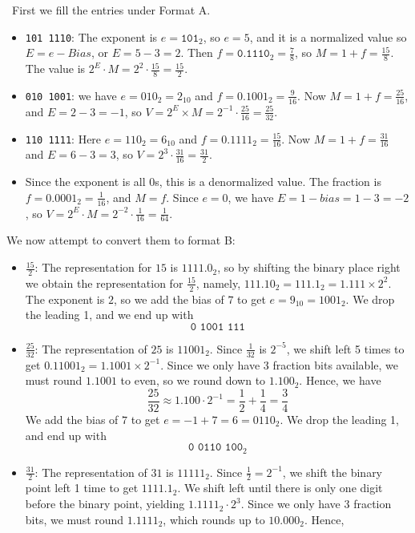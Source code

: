 \documentclass[12pt]{article}
\newenvironment{sol}[1][Solution]{\begin{trivlist}
		\item[\hskip \labelsep {\bfseries #1:}]}{\end{trivlist}}
\begin{document}
\begin{sol}
	\
	First we fill the entries under Format A.
	\begin{itemize}
		\item \texttt{101 1110}: The exponent
		is $e=\texttt{101}_2$, so $e=5$, and it is a normalized value so $E=e-Bias$,
		or $E=5-3=2$. Then $f=\texttt{0.1110}_2=\frac{7}{8}$, so $M=1+f=\frac{15}{8}$.
		The value is $2^E\cdot M=2^{2}\cdot \frac{15}{8}=\frac{15}{2}$.
		\item \texttt{010 1001}: we have $e=010_2=2_{10}$ and $f=0.1001_2=\frac{9}{16}$.
		Now $M=1+f=\frac{25}{16}$, and $E=2-3=-1$, so 
		$V=2^E\times M=2^{-1}\cdot \frac{25}{16}=\frac{25}{32}$.
		\item \texttt{110 1111}: Here $e=110_2=6_{10}$ and $f=0.1111_2=\frac{15}{16}$.
		Now $M=1+f=\frac{31}{16}$ and $E=6-3=3$, so $V=2^{3}\cdot \frac{31}{16}=\frac{31}{2}$.
		\item Since the exponent is all 0s, this is a denormalized value. The fraction
		is $f=0.0001_2=\frac{1}{16}$, and $M=f$. Since $e=0$, we have $E=1-bias=1-3=-2$,
		so $V=2^{E}\cdot M=2^{-2}\cdot \frac{1}{16}=\frac{1}{64}$. 
	\end{itemize}
	We now attempt to convert them to format B:
	\begin{itemize}
		\item $\frac{15}{2}$: The representation for $15$ is $1111.0_2$, so by shifting
		the binary place right we obtain the representation for $\frac{15}{2}$, namely,
		$111.10_2=111.1_2=1.111\times 2^2$. The exponent is $2$, so we add the bias of
		$7$ to get $e=9_{10}=1001_2$. We drop the leading 1, and we end up with
		\[
		\texttt{0 1001 111}
		\]
		\item $\frac{25}{32}$: The representation of $25$ is $11001_2$. Since $\frac{1}{32}$
		is $2^{-5}$, we shift left 5 times to get $0.11001_2=1.1001\times 2^{-1}$. Since
		we only have 3 fraction bits available, we must round $1.1001$ to even, so
		we round down to $1.100_2$. Hence, we have
		\[\frac{25}{32}\approx 1.100\cdot 2^{-1}=\frac{1}{2}+\frac{1}{4}=\frac{3}{4}\]
		We add the bias of $7$ to get $e=-1+7=6=0110_2$. We drop the leading 1, and end up with
		\[
		\texttt{0 0110 100}_2
		\]
		\item $\frac{31}{2}$: The representation of $31$ is $11111_2$. Since $\frac{1}{2}=2^{-1}$,
		we shift the binary point left 1 time to get $1111.1_2$. We shift left until there is only
		one digit before the binary point, yielding $1.1111_2\cdot 2^{3}$. Since we only have
		3 fraction bits, we must round $1.1111_2$, which rounds up to $10.000_2$. Hence,

\end{itemize}
\end{sol}
\end{document}
